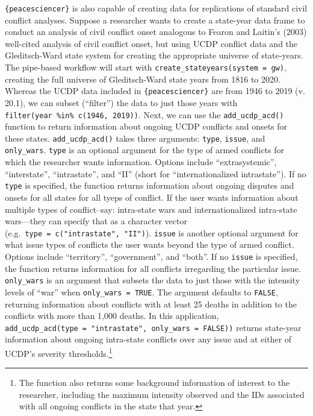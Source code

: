 \documentclass[
  11pt,
]{article}
\begin{document}
\texttt{\{peacesciencer\}} is also capable of creating data for replications of standard civil conflict analyses. Suppose a researcher wants to create a state-year data frame to conduct an analysis of civil conflict onset analogous to Fearon and Laitin's (2003) well-cited analysis of civil conflict onset, but using UCDP conflict data and the Gleditsch-Ward state system for creating the appropriate universe of state-years. The pipe-based workflow will start with \texttt{create\_stateyears(system\ =\ \textquotesingle{}gw\textquotesingle{})}, creating the full universe of Gleditsch-Ward state years from 1816 to 2020. Whereas the UCDP data included in \texttt{\{peacesciencer\}} are from 1946 to 2019 (v. 20.1), we can subset (``filter'') the data to just those years with \texttt{filter(year\ \%in\%\ c(1946,\ 2019))}. Next, we can use the \texttt{add\_ucdp\_acd()} function to return information about ongoing UCDP conflicts and onsets for these states. \texttt{add\_ucdp\_acd()} takes three arguments: \texttt{type}, \texttt{issue}, and \texttt{only\_wars}. \texttt{type} is an optional argument for the type of armed conflicts for which the researcher wants information. Options include ``extrasystemic'', ``interstate'', ``intrastate'', and ``II'' (short for ``internationalized intrastate''). If no \texttt{type} is specified, the function returns information about ongoing disputes and onsets for all states for all tyeps of conflict. If the user wants information about multiple types of conflict--say: intra-state wars and internationalized intra-state wars---they can specify that as a character vector (e.g.~\texttt{type\ =\ c("intrastate",\ "II")}). \texttt{issue} is another optional argument for what issue types of conflicts the user wants beyond the type of armed conflict. Options include ``territory'', ``government'', and ``both''. If no \texttt{issue} is specified, the function returns information for all conflicts irregarding the particular issue. \texttt{only\_wars} is an argument that subsets the data to just those with the intensity levels of ``war'' when \texttt{only\_wars\ =\ TRUE}. The argument defaults to \texttt{FALSE}, returning information about conflicts with at least 25 deaths in addition to the conflicts with more than 1,000 deaths. In this application, \texttt{add\_ucdp\_acd(type\ =\ "intrastate",\ only\_wars\ =\ FALSE))} returns state-year information about ongoing intra-state conflicts over any issue and at either of UCDP's severity thresholds.\footnote{The function also returns some background information of interest to the researcher, including the maximum intensity observed and the IDs associated with all ongoing conflicts in the state that year.}
\end{document}
